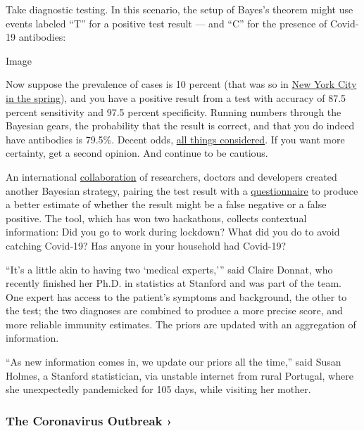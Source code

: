 Take diagnostic testing. In this scenario, the setup of Bayes's theorem
might use events labeled ``T'' for a positive test result --- and ``C''
for the presence of Covid-19 antibodies:

Image

Now suppose the prevalence of cases is 10 percent (that was so in
\href{https://dash.harvard.edu/bitstream/handle/1/42665370/Kissler_etal_NYC_mobility.pdf?sequence=1\&isAllowed=y}{New
York City in the spring}), and you have a positive result from a test
with accuracy of 87.5 percent sensitivity and 97.5 percent specificity.
Running numbers through the Bayesian gears, the probability that the
result is correct, and that you do indeed have antibodies is 79.5\%.
Decent odds,
\href{https://www.nytimes3xbfgragh.onion/2020/07/26/health/coronvirus-antibody-tests.html?searchResultPosition=1}{all
things considered}. If you want more certainty, get a second opinion.
And continue to be cautious.

An international \href{https://arxiv.org/abs/2007.13847}{collaboration}
of researchers, doctors and developers created another Bayesian
strategy, pairing the test result with a
\href{http://homecovidtests.org}{questionnaire} to produce a better
estimate of whether the result might be a false negative or a false
positive. The tool, which has won two hackathons, collects contextual
information: Did you go to work during lockdown? What did you do to
avoid catching Covid-19? Has anyone in your household had Covid-19?

``It's a little akin to having two `medical experts,''' said Claire
Donnat, who recently finished her Ph.D. in statistics at Stanford and
was part of the team. One expert has access to the patient's symptoms
and background, the other to the test; the two diagnoses are combined to
produce a more precise score, and more reliable immunity estimates. The
priors are updated with an aggregation of information.

``As new information comes in, we update our priors all the time,'' said
Susan Holmes, a Stanford statistician, via unstable internet from rural
Portugal, where she unexpectedly pandemicked for 105 days, while
visiting her mother.

\href{https://www.nytimes3xbfgragh.onion/news-event/coronavirus?action=click\&pgtype=Article\&state=default\&region=MAIN_CONTENT_3\&context=storylines_faq}{}

\hypertarget{the-coronavirus-outbreak-}{%
\subsubsection{The Coronavirus Outbreak
›}\label{the-coronavirus-outbreak-}}


